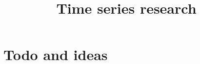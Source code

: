 \documentclass[11pt,a4paper]{report}
\title{Time series research}
\begin{document}
\maketitle

\chapter{Todo and ideas}





\end{document}
